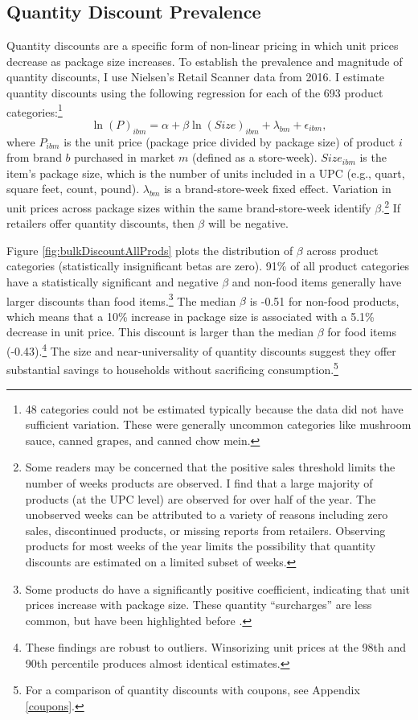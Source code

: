 \documentclass[AER]{AEA_mal}
\begin{document}
\subsection{Quantity Discount Prevalence}
\label{prevalence}
Quantity discounts are a specific form of non-linear pricing in which unit prices decrease as package size increases. To establish the prevalence and magnitude of quantity discounts, I use Nielsen's Retail Scanner data from 2016. I estimate quantity discounts using the following regression for each of the 693 product categories:\footnote{48 categories could not be estimated typically because the data did not have sufficient variation. These were generally uncommon categories like mushroom sauce, canned grapes, and canned chow mein.}
\begin{equation}
\label{eq:bulkDiscount}
\ln(P)_{ibm} = \alpha + \beta \ln(Size)_{ibm} + \lambda_{bm} + \epsilon_{ibm},
\end{equation}
where $P_{ibm}$ is the unit price (package price divided by package size) of product $i$ from brand $b$ purchased in market $m$ (defined as a store-week). $Size_{ibm}$ is the item's package size, which is the number of units included in a UPC (e.g., quart, square feet, count, pound). $\lambda_{bm}$ is a brand-store-week fixed effect. Variation in unit prices across package sizes within the same brand-store-week identify $\beta$.\footnote{Some readers may be concerned that the positive sales threshold limits the number of weeks products are observed. I find that a large majority of products (at the UPC level) are observed for over half of the year. The unobserved weeks can be attributed to a variety of reasons including zero sales, discontinued products, or missing reports from retailers. Observing products for most weeks of the year limits the possibility that quantity discounts are estimated on a limited subset of weeks.} If retailers offer quantity discounts, then $\beta$ will be negative.

Figure \ref{fig:bulkDiscountAllProds} plots the distribution of $\beta$ across product categories (statistically insignificant betas are zero). 91\% of all product categories have a statistically significant and negative $\beta$ and non-food items generally have larger discounts than food items.\footnote{Some products do have a significantly positive coefficient, indicating that unit prices increase with package size. These quantity ``surcharges'' are less common, but have been highlighted before \citep{sprott2003}.} The median $\beta$ is -0.51 for non-food products, which means that a 10\% increase in package size is associated with a 5.1\% decrease in unit price. This discount is larger than the median $\beta$ for food items (-0.43).\footnote{These findings are robust to outliers. Winsorizing unit prices at the 98th and 90th percentile produces almost identical estimates.} The size and near-universality of quantity discounts suggest they offer substantial savings to households without sacrificing consumption.\footnote{For a comparison of quantity discounts with coupons, see Appendix \ref{coupons}.}
\end{document}
